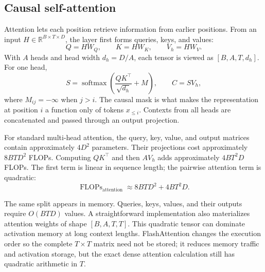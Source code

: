\subsection{Causal self-attention}

Attention lets each position retrieve information from earlier positions. From an input
$H\in\mathbb{R}^{B\times T\times D}$, the layer first forms queries, keys, and values:
\begin{equation}
  Q=HW_Q,\qquad K=HW_K,\qquad V_h=HW_V.
\end{equation}
With $A$ heads and head width $d_h=D/A$, each tensor is viewed as
$[B,A,T,d_h]$. For one head,
\begin{equation}
  S=\operatorname{softmax}\!\left(\frac{QK^\top}{\sqrt{d_h}}+M\right),
  \qquad C=SV_h,
\end{equation}
where $M_{ij}=-\infty$ when $j>i$. The causal mask is what makes the representation at
position $i$ a function only of tokens $x_{\leq i}$. Contexts from all heads are
concatenated and passed through an output projection.

For standard multi-head attention, the query, key, value, and output matrices contain
approximately $4D^2$ parameters. Their projections cost approximately
$8BTD^2$ FLOPs. Computing $QK^\top$ and then $AV_h$ adds approximately
$4BT^2D$ FLOPs. The first term is linear in sequence length; the pairwise attention term
is quadratic:
\begin{equation}
  \operatorname{FLOPs}_{\mathrm{attention}}
  \approx 8BTD^2+4BT^2D.
\end{equation}

The same split appears in memory. Queries, keys, values, and their outputs require
$O(BTD)$ values. A straightforward implementation also materializes attention weights of
shape $[B,A,T,T]$. This quadratic tensor can dominate activation memory at long context
lengths. FlashAttention changes the execution order so the complete $T\times T$ matrix
need not be stored; it reduces memory traffic and activation storage, but the exact dense
attention calculation still has quadratic arithmetic in $T$.
